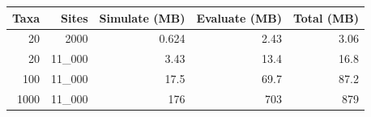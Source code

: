 \begin{tabular}{rrrrr}
  \toprule
  Taxa & Sites & Simulate (MB) & Evaluate (MB) & Total (MB) \\
  \midrule
  20 & 2000 & 0.624 & 2.43 & 3.06 \\
  20 & 11\_000 & 3.43 & 13.4 & 16.8 \\
  100 & 11\_000 & 17.5 & 69.7 & 87.2 \\
  \midrule
  1000 & 11\_000 & 176 & 703 & 879 \\
  \bottomrule
\end{tabular}
